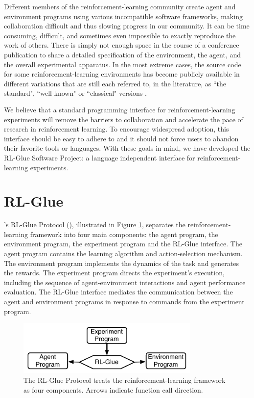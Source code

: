 \documentclass[twoside,11pt]{article}
\begin{document}
Different members of the reinforcement-learning community create agent and environment programs using various incompatible software frameworks, making collaboration difficult and thus slowing progress in our community. It  can be time consuming, difficult, and sometimes even impossible to exactly reproduce the work of others.  There is simply not enough space in the course of a conference publication to share a detailed specification of the environment, the agent, and the overall experimental apparatus.
In the most extreme cases, the source code for some reinforcement-learning environments has become publicly available in different variations that are still each referred to, in the literature, as ``the standard", ``well-known" or ``classical"  versions \citep{whiteThesis}.

We believe that a standard programming interface for reinforcement-learning experiments will remove the barriers to collaboration and accelerate the pace of research in reinforcement learning.  To encourage widespread adoption, this interface should be easy to adhere to and it should not force users to abandon their favorite tools or languages.  With these goals in mind, we have developed the RL-Glue Software Project: a language independent interface for reinforcement-learning experiments.





	 

\section{RL-Glue}

\citeauthor{whiteThesis}'s RL-Glue Protocol (\citeyear{whiteThesis}), illustrated in Figure \ref{fig:RLDIA}, separates the reinforcement-learning framework into four main components: the agent program, the environment program, the experiment program and the RL-Glue interface. The agent program contains the learning algorithm and action-selection mechanism. The environment program implements the dynamics of the task and generates the rewards. The experiment program directs the experiment's execution, including the sequence of agent-environment interactions and agent performance evaluation.  The RL-Glue interface mediates the communication between the agent and environment programs in response to commands from the experiment program. 

\begin{figure}[ht]
\begin{center}
\includegraphics[width=9cm]{glue.pdf}
\vspace{-0.2cm}
\caption{\small The RL-Glue Protocol treats the reinforcement-learning framework as four components.  Arrows indicate function call direction.}\label{fig:RLDIA}
\end{center}
\vspace{-0.4cm}
\end{figure}
\end{document}
